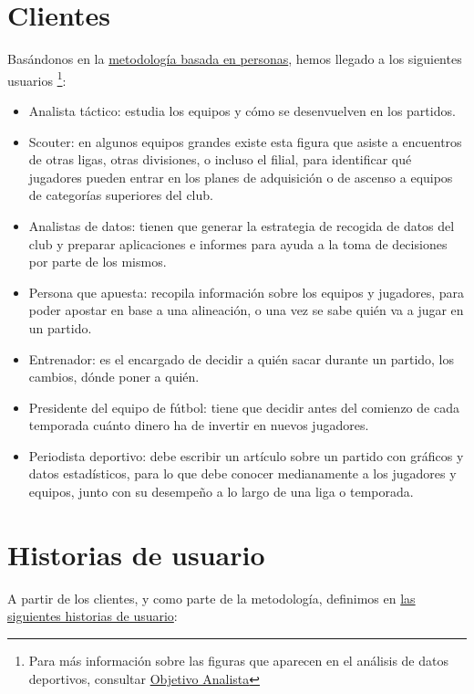 \section{Clientes}
Basándonos en la \href{https://www.designthinking.services/herramientas-design-thinking/metodo-persona/}{metodología basada en personas}, 
hemos llegado a los siguientes usuarios \footnote{Para más información sobre las
  figuras que aparecen en el análisis de datos deportivos, consultar
  \href{https://objetivoanalista.com}{Objetivo Analista}}:
\begin{itemize}
    \item Analista táctico: estudia los equipos y cómo se desenvuelven en los partidos. 
    \item {Scouter}: en algunos equipos grandes existe esta figura que asiste a
      encuentros de otras ligas, otras divisiones, o incluso el filial, para
      identificar qué jugadores pueden entrar en los planes de adquisición o de
      ascenso a equipos de categorías superiores del club.
    \item Analistas de datos: tienen que generar la estrategia de recogida de
      datos del club y preparar aplicaciones e informes para ayuda a la toma de
      decisiones por parte de los mismos.
    \item Persona que apuesta: recopila información sobre los equipos y jugadores, para poder apostar 
    en base a una alineación, o una vez se sabe quién va a jugar en un partido. 
    \item Entrenador: es el encargado de decidir a quién sacar durante un partido, los 
    cambios, dónde poner a quién. 
    \item Presidente del equipo de fútbol: tiene que decidir antes del comienzo 
    de cada temporada cuánto dinero ha de invertir en nuevos jugadores. 
    \item Periodista deportivo: debe escribir un artículo sobre un partido con gráficos y datos estadísticos, 
    para lo que debe conocer medianamente a los jugadores y equipos, junto con su desempeño a lo largo de 
    una liga o temporada. 
\end{itemize}

\section{Historias de usuario}  

A partir de los clientes, y como parte de la metodología, definimos en \href{https://github.com/ElenaMerelo/TFG/issues?q=is%3Aopen+is%3Aissue+label%3Auser-story}{las siguientes historias de usuario}: 

